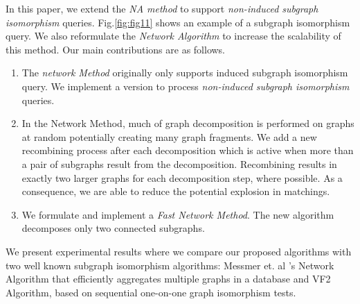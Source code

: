 In this paper, we extend the \textit{NA method} to support \textit{non-induced subgraph isomorphism} queries.
Fig.\ref{fig:fig11} shows an example of a subgraph isomorphism query. We also reformulate the \textit{Network Algorithm} to increase the scalability of this method.
Our main contributions are as follows.

\begin{enumerate}
\item The \textit{network Method} originally only supports induced subgraph isomorphism query. We implement a version to process \textit{non-induced subgraph isomorphism} queries.
\item  In the Network Method, much of graph decomposition is performed on graphs at random potentially creating many graph fragments. We add a new recombining process after each decomposition which is active when more than a pair of  subgraphs result from the decomposition.  Recombining results in exactly  two larger graphs for each decomposition step, where possible.  As a consequence, we are able to reduce the potential  explosion in matchings. 
\item We formulate and implement  a  \textit{Fast Network Method}. The new algorithm decomposes only two connected subgraphs. 
\end{enumerate}

We present experimental results where we compare our proposed algorithms with two well known subgraph isomorphism algorithms: Messmer et. al 's\cite{messmer} Network Algorithm that efficiently aggregates multiple graphs in a database
 and VF2\cite{vf} Algorithm, based on sequential one-on-one graph isomorphism tests. 
